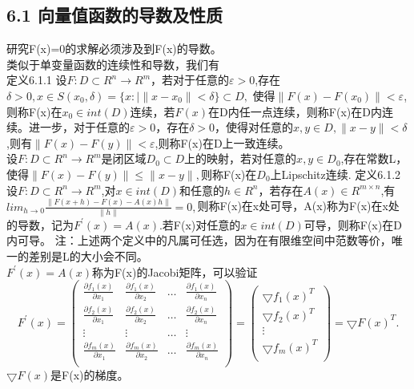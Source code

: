 \documentclass[a4paper,12pt]{article}
\begin{document}
\begin{CJK*}{UTF8}{gbsn}
	\section{6.1 向量值函数的导数及性质}
	研究F(x)=0的求解必须涉及到F(x)的导数。\\
	类似于单变量函数的连续性和导数，我们有\\
	定义6.1.1 设$F:D\subset R^n \to R^m$，若对于任意的$\varepsilon > 0$,存在
	$\delta >0,x\in S(x_0,\delta)=\{x:| \|x-x_0\| < \delta\}\subset D,$
	使得$\|F(x)-F(x_0)\|<\varepsilon$,则称F(x)在$x_0\in int(D)$连续，若$F(x)$在D内任一点连续，则称F(x)在D内连续。进一步，对于任意的$\varepsilon>0$，存在$\delta>0$，使得对任意的$x,y\in D,\|x-y\|<\delta$,则有$\|F(x)-F(y)\|<\varepsilon$,则称F(x)在D上一致连续。\\
	设$F:D\subset R^n\to R^m$是闭区域$D_0\subset D$上的映射，若对任意的$x,y\in D_0$,存在常数L，使得$\|F(x)-F(y)\|\le\|x-y\|,$则称F(x)在$D_0$上Lipschitz连续.
	定义6.1.2 设$F:D\subset R^n \to R^m$,对$x \in int(D)$和任意的$h \in R^n$，若存在$A(x) \in R^{m \times n}$,有$lim_{h \to 0}\frac{\|F(x+h)-F(x)-A(x)h\|}{\|h\|}=0,$则称F(x)在x处可导，A(x)称为F(x)在x处的导数，记为$F^{'}(x)=A(x)$.若F(x)对任意的$x\in int(D)$可导，则称F(x)在D内可导。
	注：上述两个定义中的凡属可任选，因为在有限维空间中范数等价，唯一的差别是L的大小会不同。\\
	$F^{'}(x)=A(x)$称为F(x)的Jacobi矩阵，可以验证
	$$
		F^{'}(x) = \left(
		\begin{array}{cccc}
			\frac{\partial f_1(x)}{\partial x_1} & \frac{\partial f_1(x)}{\partial x_2} & \ldots & \frac{\partial f_1(x)}{\partial x_n} \\
			\frac{\partial f_2(x)}{\partial x_1} & \frac{\partial f_2(x)}{\partial x_2} & \ldots & \frac{\partial f_2(x)}{\partial x_n} \\
			\vdots & \vdots & \ldots & \vdots \\
			\frac{\partial f_m(x)}{\partial x_1} & \frac{\partial f_m(x)}{\partial x_2} & \ldots & \frac{\partial f_m(x)}{\partial x_n} \\
		\end{array}
		\right)
		=\left(
		\begin{array}{c}
			\bigtriangledown f_1(x)^T\\
			\bigtriangledown f_2(x)^T\\
			\vdots \\
			\bigtriangledown f_m(x)^T\\
		\end{array}
		\right)
		=\bigtriangledown F(x)^T.
	$$
	$\bigtriangledown F(x)$是F(x)的梯度。\\

\end{CJK*}
\end{document}
